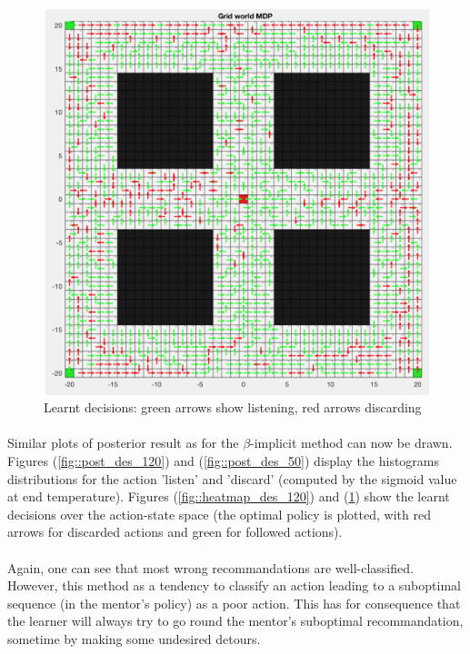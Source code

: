 \documentclass[a4paper]{report}
\begin{document}
{{{{\begin{figure}[ht!]
\begin{minipage}{0.5\linewidth}
\begin{center}
							\includegraphics[width=0.9\linewidth]{heatmap_decision_50}
							\caption{Learnt decisions: green arrows show listening, red arrows discarding}
							\label{fig::heatmap_des_50}
						\end{center}
					\end{minipage}
				\end{figure}
			
			\paragraph{} Similar plots of posterior result as for the $\beta$-implicit method can now be drawn. Figures (\ref{fig::post_des_120}) and (\ref{fig::post_des_50}) display the histograms distributions for the action 'listen' and 'discard' (computed by the sigmoid value at end temperature). Figures (\ref{fig::heatmap_des_120}) and (\ref{fig::heatmap_des_50}) show the learnt decisions over the action-state space (the optimal policy is plotted, with red arrows for discarded actions and green for followed actions).
			
			\paragraph{} Again, one can see that most wrong recommandations are well-classified. However, this method as a tendency to classify an action leading to a suboptimal sequence (in the mentor's policy) as a poor action. This has for consequence that the learner will always try to go round the mentor's suboptimal recommandation, sometime by making some undesired detours. 
			}
		}
}}
\end{document}
